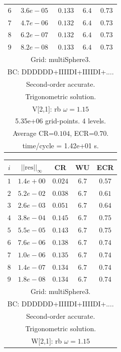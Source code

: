 \begin{table}[hbt]
\begin{center}
{\begin{tabular}{|c|c|c|c|c|}
 $ 6$  & $ 3.6e-05$ & $0.133$ & $ 6.4$ & $0.73$ \\ 
 $ 7$  & $ 4.7e-06$ & $0.132$ & $ 6.4$ & $0.73$ \\ 
 $ 8$  & $ 6.2e-07$ & $0.132$ & $ 6.4$ & $0.73$ \\ 
 $ 9$  & $ 8.2e-08$ & $0.133$ & $ 6.4$ & $0.73$ \\ 
\hline 
\multicolumn{5}{|c|}{Grid: multiSphere3.}  \\
\multicolumn{5}{|c|}{BC: DDDDDD+IIIIDI+IIIIDI+....}  \\
\multicolumn{5}{|c|}{Second-order accurate.}  \\
\multicolumn{5}{|c|}{Trigonometric solution.}  \\
\multicolumn{5}{|c|}{V[2,1]: rb $\omega=1.15$}  \\
\multicolumn{5}{|c|}{5.35e+06 grid-points. 4 levels.}  \\
\multicolumn{5}{|c|}{Average CR=$0.104$, ECR=$0.70$.}  \\
\multicolumn{5}{|c|}{time/cycle = 1.42e+01 s.}  \\
\hline 
\end{tabular}
\begin{tabular}{|c|c|c|c|c|} \hline 
 $i$   & $\vert\vert\mbox{res}\vert\vert_\infty$  &  CR     &  WU    & ECR  \\   \hline 
 $ 1$  & $ 1.4e+00$ & $0.024$ & $ 6.7$ & $0.57$ \\ 
 $ 2$  & $ 5.2e-02$ & $0.038$ & $ 6.7$ & $0.61$ \\ 
 $ 3$  & $ 2.6e-03$ & $0.051$ & $ 6.7$ & $0.64$ \\ 
 $ 4$  & $ 3.8e-04$ & $0.145$ & $ 6.7$ & $0.75$ \\ 
 $ 5$  & $ 5.5e-05$ & $0.143$ & $ 6.7$ & $0.75$ \\ 
 $ 6$  & $ 7.6e-06$ & $0.138$ & $ 6.7$ & $0.74$ \\ 
 $ 7$  & $ 1.0e-06$ & $0.135$ & $ 6.7$ & $0.74$ \\ 
 $ 8$  & $ 1.4e-07$ & $0.134$ & $ 6.7$ & $0.74$ \\ 
 $ 9$  & $ 1.8e-08$ & $0.134$ & $ 6.7$ & $0.74$ \\ 
\hline 
\multicolumn{5}{|c|}{Grid: multiSphere3.}  \\
\multicolumn{5}{|c|}{BC: DDDDDD+IIIIDI+IIIIDI+....}  \\
\multicolumn{5}{|c|}{Second-order accurate.}  \\
\multicolumn{5}{|c|}{Trigonometric solution.}  \\
\multicolumn{5}{|c|}{W[2,1]: rb $\omega=1.15$}  \\

\end{tabular}}
\end{center}
\end{table}
